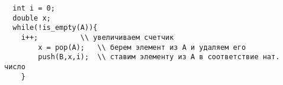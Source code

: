 \documentclass{article}
\begin{document}
\lstset{language = C, extendedchars = \true, keepspaces = true}
\begin{lstlisting}
  int i = 0;
  double x;
  while(!is_empty(A)){
    i++;          \\ увеличиваем счетчик
		x = pop(A);   \\ берем элемент из А и удаляем его
		push(B,x,i);  \\ ставим элементу из А в соответствие нат. число
    }
\end{lstlisting}
\end{document}

